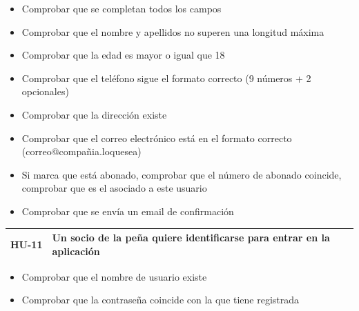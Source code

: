 \documentclass[11pt]{article}
\begin{document}
\begin{itemize}
	\item  Comprobar que se completan todos los campos
	\item  Comprobar que el nombre y apellidos no superen una longitud máxima
	\item  Comprobar que la edad es mayor o igual que 18
	\item Comprobar que el teléfono sigue el formato correcto (9 números + 2 opcionales)
	\item  Comprobar que la dirección existe 
	\item  Comprobar que el correo electrónico está en el formato correcto (correo@compañia.loquesea)
	\item  Si marca que está abonado, comprobar que el número de abonado coincide, comprobar que es el asociado a este usuario
	\item  Comprobar que se envía un email de confirmación
\end{itemize}

\begin{longtable}{p{0.12\linewidth}p{0.88\linewidth}}
	\toprule
	\textbf{HU-11} & Un socio de la peña quiere identificarse para entrar en la aplicación \\
	\bottomrule
\end{longtable}

\begin{itemize}
	\item Comprobar que el nombre de usuario existe 
	\item Comprobar que la contraseña coincide con la que tiene registrada
\end{itemize}
\end{document}
